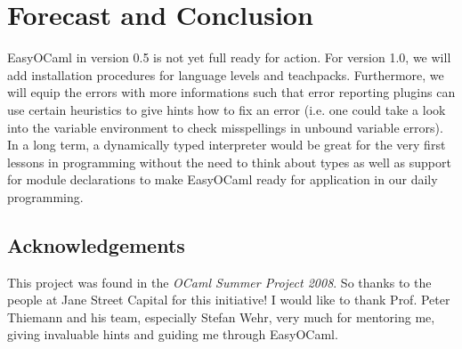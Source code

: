 
\section{Forecast and Conclusion}
\label{hd007}
EasyOCaml in version 0.5 is not yet full ready for action. For version 
1.0, we will add installation procedures for language levels and 
teachpacks. Furthermore, we will equip the errors with more informations 
such that error reporting plugins can use certain heuristics to give 
hints how to fix an error (i.e. one could take a look into the 
variable environment to check misspellings in unbound variable errors). 
In a long term, a dynamically typed interpreter would be great for the very
first lessons in programming without the need to think about types as well as
support for module declarations to make EasyOCaml ready for application in our
daily programming.


\subsection{Acknowledgements}
\label{hd007001}
This project was found in the \emph{OCaml Summer Project 2008}. So 
thanks to the people at Jane Street Capital for this initiative! I would like
to thank Prof. Peter Thiemann and his team, especially Stefan Wehr, very much
for mentoring me, giving invaluable hints and guiding me through EasyOCaml.
